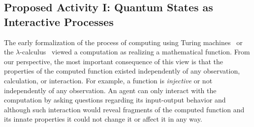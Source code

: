 \documentclass{article}
\theoremstyle{remark}
\begin{document}
\begin{itemize}
\end{itemize} 

\subsection{Proposed Activity I: Quantum States as Interactive Processes} 

The early formalization of the process of computing using Turing
machines~\cite{citeulike:321509} or the
$\lambda$-calculus~\cite{Barendregt:Lambda} viewed a computation as
realizing a mathematical function. From our perspective, the most
important consequence of this view is that the properties of the
computed function existed independently of any observation,
calculation, or interaction. For example, a function is
\emph{injective} or not independently of any observation. An agent can
only interact with the computation by asking questions regarding its
input-output behavior and although such interaction would reveal
fragments of the computed function and its innate properties it could
not change it or affect it in any way.
\end{document}
